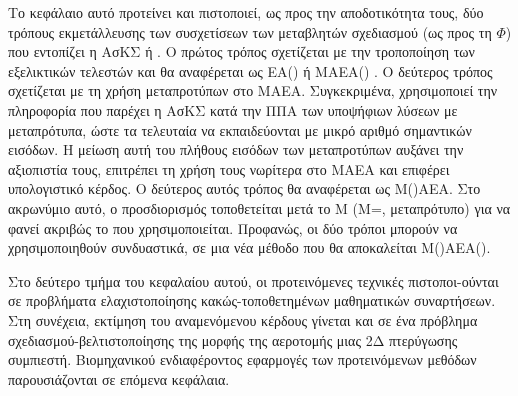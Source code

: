 Το κεφάλαιο αυτό προτείνει και πιστοποιεί, ως προς την αποδοτικότητα τους, δύο τρόπους εκμετάλλευσης των συσχετίσεων των μεταβλητών σχεδιασμού (ως προς τη $\Phi$) που εντοπίζει η ΑσΚΣ ή . Ο πρώτος τρόπος σχετίζεται με την τροποποίηση των εξελικτικών τελεστών και θα αναφέρεται ως ΕΑ() ή ΜΑΕΑ() \cite{LTT_2_054}. Ο δεύτερος τρόπος σχετίζεται με τη χρήση μεταπροτύπων στο ΜΑΕΑ. Συγκεκριμένα, χρησιμοποιεί την πληροφορία που παρέχει η ΑσΚΣ κατά την ΠΠΑ των υποψήφιων λύσεων με μεταπρότυπα, ώστε τα τελευταία να εκπαιδεύονται με μικρό αριθμό σημαντικών εισόδων. Η μείωση αυτή του πλήθους εισόδων των μεταπροτύπων αυξάνει την αξιοπιστία τους, επιτρέπει τη χρήση τους νωρίτερα στο ΜΑΕΑ και επιφέρει υπολογιστικό κέρδος. Ο δεύτερος αυτός τρόπος θα αναφέρεται ως Μ()ΑΕΑ. Στο ακρωνύμιο αυτό, ο προσδιορισμός  τοποθετείται μετά το Μ (Μ=, μεταπρότυπο) για να φανεί ακριβώς το που χρησιμοποιείται. Προφανώς, οι δύο τρόποι μπορούν να χρησιμοποιηθούν συνδυαστικά, σε μια νέα μέθοδο που θα αποκαλείται Μ()ΑΕΑ().

Στο δεύτερο τμήμα του κεφαλαίου αυτού, οι προτεινόμενες τεχνικές πιστοποι-ούνται σε προβλήματα ελαχιστοποίησης κακώς-τοποθετημένων μαθηματικών συναρτήσεων. Στη συνέχεια, εκτίμηση του αναμενόμενου κέρδους γίνεται και σε ένα πρόβλημα σχεδιασμού-βελτιστοποίησης της μορφής της αεροτομής μιας 2Δ πτερύγωσης συμπιεστή. Βιομηχανικού ενδιαφέροντος εφαρμογές των προτεινόμενων μεθόδων παρουσιάζονται σε επόμενα κεφάλαια.             

 

    
